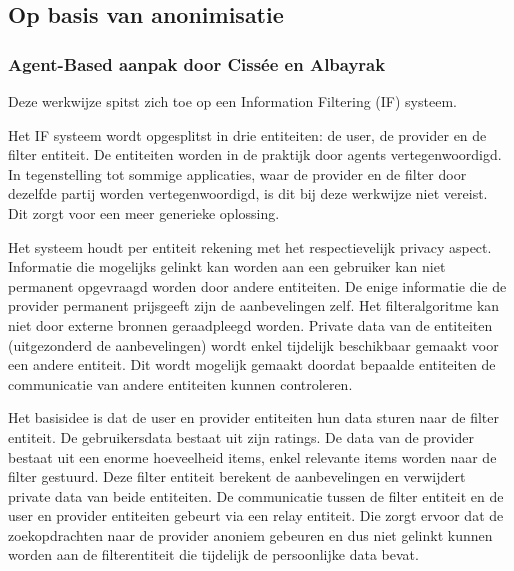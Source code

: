 
\subsection{Op basis van anonimisatie}

\subsubsection{Agent-Based aanpak door Cissée en Albayrak \cite{CisseeAAP}}

Deze werkwijze spitst zich toe op een Information Filtering (IF) systeem.

Het IF systeem wordt opgesplitst in drie entiteiten: de user, de provider en de filter entiteit. De entiteiten worden in de praktijk door agents vertegenwoordigd. In tegenstelling tot sommige applicaties, waar de provider en de filter door dezelfde partij worden vertegenwoordigd, is dit bij deze werkwijze niet vereist. Dit zorgt voor een meer generieke oplossing. 

Het systeem houdt per entiteit rekening met het respectievelijk privacy aspect. Informatie die mogelijks gelinkt kan worden aan een gebruiker kan niet permanent opgevraagd worden door andere entiteiten. De enige informatie die de provider permanent prijsgeeft zijn de aanbevelingen zelf. Het filteralgoritme kan niet door externe bronnen geraadpleegd worden. Private data van de entiteiten (uitgezonderd de aanbevelingen) wordt enkel tijdelijk beschikbaar gemaakt voor een andere entiteit. Dit wordt mogelijk gemaakt doordat bepaalde entiteiten de communicatie van andere entiteiten kunnen controleren.

Het basisidee is dat de user en provider entiteiten hun data sturen naar de filter entiteit.  De gebruikersdata bestaat uit zijn ratings. De data van de provider bestaat uit een enorme hoeveelheid items, enkel relevante items worden naar de filter gestuurd. Deze filter entiteit berekent de aanbevelingen en verwijdert private data van beide entiteiten. De communicatie tussen de filter entiteit en de user en provider entiteiten gebeurt via een relay entiteit. Die zorgt ervoor dat de zoekopdrachten naar de provider anoniem gebeuren en dus niet gelinkt kunnen worden aan de filterentiteit die tijdelijk de persoonlijke data bevat.

